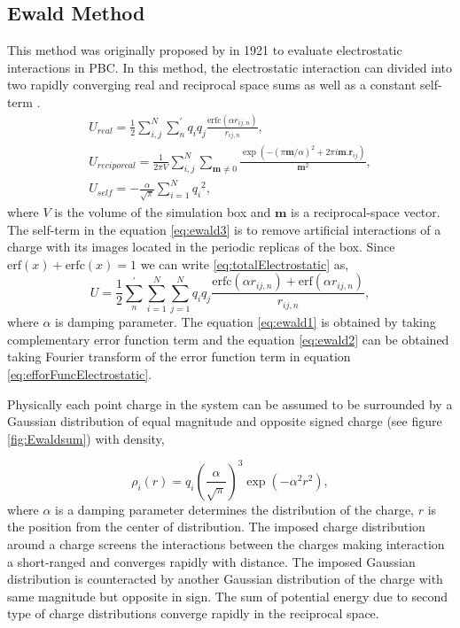 \subsection{Ewald Method}
This method was originally proposed by  in 1921 to evaluate electrostatic interactions in PBC. In this method, the electrostatic interaction  can divided into two rapidly converging real and reciprocal space sums as well as a constant self-term \cite{Toukmaji96}.  
\begin{subequations}
\begin{gather}
U_{real} = \frac{1}{2} \sum_{i,j}^{N}{\sum_{n}^{'}{{q_i q_j}\frac{\mathrm{erfc}(\alpha r_{ij,n})}{r_{ij,n}}}}, \label{eq:ewald1}\\
U_{reciporcal} = \frac{1}{2\pi V}\sum_{i,j}^{N}{\sum_{\mathbf{m} \neq 0}\frac{\exp(-(\pi \mathbf{m}/\alpha)^2 + 2\pi i \mathbf{m}.\mathbf{r}_{ij})}{\mathbf{m}^2}},\label{eq:ewald2} \\
U_{self} = -\frac{\alpha}{\sqrt{\pi}} \sum_{i =1}^{N} {q_i}^2 ,\label{eq:ewald3}
\end{gather}
\end{subequations}
where $V$ is the volume of the simulation box and $\mathbf{m}$ is a reciprocal-space vector. The self-term in the equation \ref{eq:ewald3} is to remove artificial interactions of a charge with its images located in the periodic replicas of the box. Since  $\mathrm{erf}(x) + \mathrm{erfc}(x) = 1$ we can write \ref{eq:totalElectrostatic} as,
\begin{equation}
U = \frac{1}{2}\sum_n^{'}{\sum_{i=1}^N { \sum_{j=1}^N {q_i q_j}}}\frac{\mathrm{erfc}(\alpha r_{ij,n})+\mathrm{erf}(\alpha r_{ij,n})}{r_{ij,n}},
\label{eq:efforFuncElectrostatic}
\end{equation}
where $\alpha$ is damping parameter. The equation \ref{eq:ewald1} is obtained by taking complementary error function term and the equation \ref{eq:ewald2} can be obtained taking Fourier transform of the error function term in equation \ref{eq:efforFuncElectrostatic}.
 
Physically each point charge in the system can be assumed to be surrounded by a Gaussian distribution of equal magnitude and opposite signed charge (see figure \ref{fig:Ewaldsum}) with density,

\begin{equation}
\rho_i (r) = q_i \left(\frac{\alpha}{\sqrt{\pi}}\right)^3 \exp(-\alpha^2 r^2),
\label{eq:chargeDistribution}
\end{equation}
where $\alpha$ is a damping parameter determines the distribution of the charge, $r$ is the position from the center of distribution. The imposed charge distribution around a charge screens the interactions between the charges making interaction a short-ranged and converges rapidly with distance. The imposed Gaussian distribution is counteracted by another Gaussian distribution of the charge with same magnitude but opposite in sign. The sum of potential energy due to second type of charge distributions converge rapidly in the reciprocal space. 


